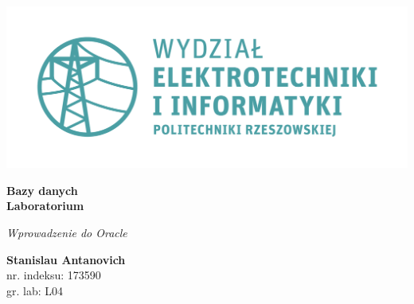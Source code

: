 \documentclass{article}
\begin{document}
\begin{titlepage}
\begin{center}
	\includegraphics[scale=0.7]{logo.png}

	\vspace*{4cm}
	\textbf{Bazy danych\\ Laboratorium}

	\vspace{1.5cm}
	\textit{Wprowadzenie do Oracle}

	\vspace{1.5cm}
	\textbf{Stanislau Antanovich}\\
	nr. indeksu: 173590\\
	gr. lab: L04
\end{center}
\end{titlepage}
\end{document}
